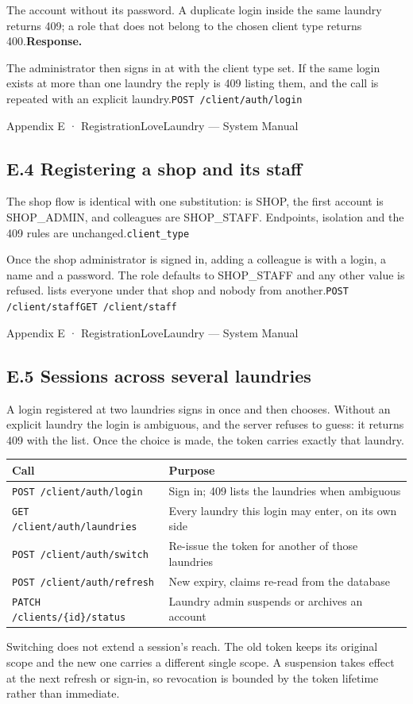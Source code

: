 \documentclass[11pt,a4paper,oneside]{book}
\begin{document}
The account without its password. A duplicate login inside the same laundry returns 409; a role that does not belong to the chosen client type returns 400.\textbf{Response.}

The administrator then signs in at  with the client type set. If the same login exists at more than one laundry the reply is 409 listing them, and the call is repeated with an explicit laundry.\texttt{POST /client/auth/login}

Appendix E · RegistrationLoveLaundry — System Manual

\subsection*{E.4 Registering a shop and its staff}
The shop flow is identical with one substitution:  is SHOP, the first account is SHOP\_ADMIN, and colleagues are SHOP\_STAFF. Endpoints, isolation and the 409 rules are unchanged.\texttt{client\_type}

Once the shop administrator is signed in, adding a colleague is  with a login, a name and a password. The role defaults to SHOP\_STAFF and any other value is refused.  lists everyone under that shop and nobody from another.\texttt{POST /client/staff}\texttt{GET /client/staff}

Appendix E · RegistrationLoveLaundry — System Manual

\subsection*{E.5 Sessions across several laundries}
A login registered at two laundries signs in once and then chooses. Without an explicit laundry the login is ambiguous, and the server refuses to guess: it returns 409 with the list. Once the choice is made, the token carries exactly that laundry.

\begin{center}\small
\begin{tabularx}{\linewidth}{|X|X|}
\hline
\rowcolor{lightgrey}
\textbf{Call} & \textbf{Purpose} \\ \hline
\texttt{POST /client/auth/login} & Sign in; 409 lists the laundries when ambiguous \\ \hline
\texttt{GET /client/auth/laundries} & Every laundry this login may enter, on its own side \\ \hline
\texttt{POST /client/auth/switch} & Re-issue the token for another of those laundries \\ \hline
\texttt{POST /client/auth/refresh} & New expiry, claims re-read from the database \\ \hline
\texttt{PATCH /clients/\{id\}/status} & Laundry admin suspends or archives an account \\ \hline
\end{tabularx}
\end{center}
Switching does not extend a session’s reach. The old token keeps its original scope and the new one carries a different single scope. A suspension takes effect at the next refresh or sign-in, so revocation is bounded by the token lifetime rather than immediate.
\end{document}
